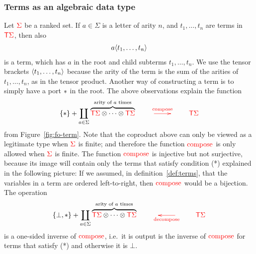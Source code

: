 \subsubsection{Terms as an algebraic data type} Let ${\color{red}{\Sigma}}$ be a ranked set. If $a \in \Sigma$ is a letter of arity $n$, and $t_1,\ldots,t_n$ are terms in ${\color{red}{\mathsf T}} {\color{red}{\Sigma}}$, then also 
\begin{align*}
    a \langle{t_1,\ldots,t_n}\rangle
\end{align*}
is a term, which has $a$ in the root and child subterms $t_1,\ldots,t_n$. We use the tensor brackets $\langle{t_1,\ldots,t_n}\rangle$ because the arity of the term is the sum of the arities of $t_1,\ldots,t_n$, as in the tensor product. Another way of constructing a term is to simply have a port $*$ in the root. The above observations explain the function 
\begin{align*}     
    \set * + \coprod_{a \in \Sigma} \overbrace{\tmonad \rSigma \otimes \cdots \otimes \tmonad \rSigma}^{\text{arity of $a$ times}}   \qquad \ranked{\xymatrix{
        \ar[r]^{\composeterm}& 
    }} \qquad \tmonad \rSigma
\end{align*}
from Figure~\ref{fig:fo-term}. Note that the coproduct above can only be viewed as a legitimate type when ${\color{red}{\Sigma}}$ is finite; and therefore the function ${\color{red}{\mathrm{compose}}}$ is only allowed when ${\color{red}{\Sigma}}$ is finite. The function ${\color{red}{\mathrm{compose}}}$ is injective but not surjective, because its image will contain only the terms that satisfy condition (*) explained in the following picture: 
If we assumed, in definition~\ref{def:terms}, that the variables in a term are ordered left-to-right, then ${\color{red}{\mathrm{compose}}}$ would be a bijection. The operation 
\begin{align*}     
    \set {\bot,*} + \coprod_{a \in \Sigma} \overbrace{\tmonad \rSigma \otimes \cdots \otimes \tmonad \rSigma}^{\text{arity of $a$ times}}   \qquad \ranked{\xymatrix{
&          \ar[l]^{\decomposeterm} 
    }} \qquad \tmonad \rSigma
\end{align*}
is a one-sided inverse of ${\color{red}{\mathrm{compose}}}$, i.e.~it is output is the inverse of ${\color{red}{\mathrm{compose}}}$ for terms that satisfy (*) and otherwise it is $\bot$. 


